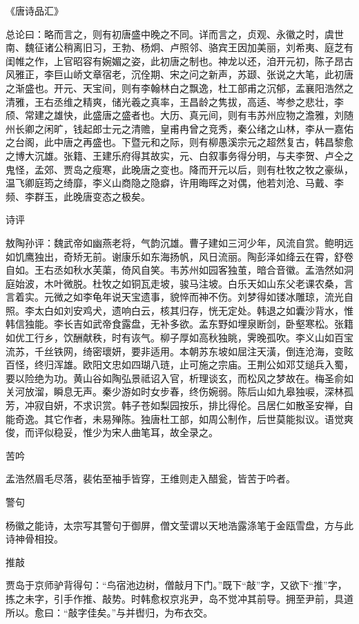 \documentclass[a4paper,12pt,UTF8,twoside]{ctexbook}
\begin{document}
    《唐诗品汇》
    
    总论曰：略而言之，则有初唐盛中晚之不同。详而言之，贞观、永徽之时，虞世南、魏征诸公稍离旧习，王勃、杨炯、卢照邻、骆宾王因加美丽，刘希夷、庭芝有闺帷之作，上官昭容有婉媚之姿，此初唐之制也。神龙以还，洎开元初，陈子昂古风雅正，李巨山峤文章宿老，沉佺期、宋之问之新声，苏颋、张说之大笔，此初唐之渐盛也。开元、天宝间，则有李翰林白之飘逸，杜工部甫之沉郁，孟襄阳浩然之清雅，王右丞维之精爽，储光羲之真率，王昌龄之隽拔，高适、岑参之悲壮，李颀、常建之雄快，此盛唐之盛者也。大历、真元间，则有韦苏州应物之澹雅，刘随州长卿之闲旷，钱起郎士元之清赡，皇甫冉曾之竞秀，秦公绪之山林，李从一嘉佑之台阁，此中唐之再盛也。下暨元和之际，则有柳愚溪宗元之超然复古，韩昌黎愈之博大沉雄。张籍、王建乐府得其故实，元、白叙事务得分明，与夫李贺、卢仝之鬼怪，孟郊、贾岛之瘦寒，此晚唐之变也。降而开元以后，则有杜牧之牧之豪纵，温飞卿庭筠之绮靡，李义山商隐之隐癖，许用晦晖之对偶，他若刘沧、马戴、李频、李群玉，此晚唐变态之极矣。
    
    诗评
    
    敖陶孙评：魏武帝如幽燕老将，气韵沉雄。曹子建如三河少年，风流自赏。鲍明远如饥鹰独出，奇矫无前。谢康乐如东海扬帆，风日流丽。陶彭泽如绛云在霄，舒卷自如。王右丞如秋水芙蕖，倚风自笑。韦苏州如园客独茧，暗合音徽。孟浩然如洞庭始波，木叶微脱。杜牧之如铜瓦走坡，骏马注坡。白乐天如山东父老课农桑，言言着实。元微之如李龟年说天宝遗事，貌悴而神不伤。刘梦得如镂冰雕琼，流光自照。李太白如刘安鸡犬，遗响白云，核其归存，恍无定处。韩退之如囊沙背水，惟韩信独能。李长吉如武帝食露盘，无补多欲。孟东野如埋泉断剑，卧壑寒松。张籍如优工行乡，饮酬献秩，时有诙气。柳子厚如高秋独眺，霁晚孤吹。李义山如百宝流苏，千丝铁网，绮密瓌妍，要非适用。本朝苏东坡如屈注天潢，倒连沧海，变眩百怪，终归浑雄。欧阳文忠如四瑚八琏，止可施之宗庙。王荆公如邓艾缒兵入蜀，要以险绝为功。黄山谷如陶弘景祗诏入官，析理谈玄，而松风之梦故在。梅圣俞如关河放溜，瞬息无声。秦少游如时女步春，终伤婉弱。陈后山如九皋独唳，深林孤芳，冲寂自妍，不求识赏。韩子苍如梨园按乐，排比得伦。吕居仁如散圣安禅，自能奇逸。其它作者，未易殚陈。独唐杜工部，如周公制作，后世莫能拟议。语觉爽俊，而评似稳妥，惟少为宋人曲笔耳，故全录之。
    
    苦吟
    
    孟浩然眉毛尽落，裴佑至袖手皆穿，王维则走入醋瓮，皆苦于吟者。
    
    警句
    
    杨徽之能诗，太宗写其警句于御屏，僧文莹谓以天地浩露涤笔于金瓯雪盘，方与此诗神骨相投。
    
    推敲
    
    贾岛于京师驴背得句：“鸟宿池边树，僧敲月下门。”既下“敲”字，又欲下“推”字，拣之未字，引手作推、敲势。时韩愈权京兆尹，岛不觉冲其前导。拥至尹前，具道所以。愈曰：“敲字佳矣。”与并辔归，为布衣交。
    
\end{document}

